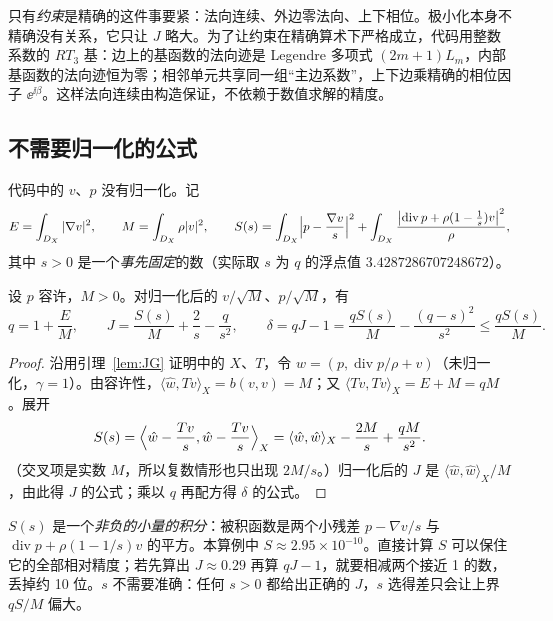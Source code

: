 \documentclass[11pt,a4paper,fontset=fandol]{ctexart}
\begin{document}
只有\emph{约束}是精确的这件事要紧：法向连续、外边零法向、上下相位。极小化本身不精确没有关系，它只让 $J$ 略大。为了让约束在精确算术下严格成立，代码用整数系数的 $RT_3$ 基：边上的基函数的法向迹是 Legendre 多项式 $(2m+1)L_m$，内部基函数的法向迹恒为零；相邻单元共享同一组“主边系数”，上下边乘精确的相位因子 $\ee^{\ii\beta}$。这样法向连续由构造保证，不依赖于数值求解的精度。

\subsection{不需要归一化的公式}

代码中的 $v$、$p$ 没有归一化。记
\begin{equation}
\label{eq:EMS}
E=\int_{D_X}|\nabla v|^2,\qquad M=\int_{D_X}\rho|v|^2,\qquad
S(s)=\int_{D_X}\Bigl|p-\frac{\nabla v}{s}\Bigr|^2+\int_{D_X}\frac{\bigl|\operatorname{div}p+\rho(1-\frac1s)v\bigr|^2}{\rho},
\end{equation}
其中 $s>0$ 是一个\emph{事先固定}的数（实际取 $s$ 为 $q$ 的浮点值 $3.4287286707248672$）。

\begin{lemma}[归一化与非负缺陷]
\label{lem:normalization}
设 $p$ 容许，$M>0$。对归一化后的 $v/\sqrt M$、$p/\sqrt M$，有
\begin{equation}
\label{eq:delta-S}
q=1+\frac EM,\qquad J=\frac{S(s)}M+\frac2s-\frac q{s^2},\qquad
\delta=qJ-1=\frac{qS(s)}M-\frac{(q-s)^2}{s^2}\le\frac{qS(s)}{M}.
\end{equation}
\end{lemma}

\begin{proof}
沿用引理~\ref{lem:JG} 证明中的 $X$、$T$，令 $\hat w=(p,\operatorname{div}p/\rho+v)$（未归一化，$\gamma=1$）。由容许性，$\langle\hat w,Tv\rangle_X=b(v,v)=M$；又 $\langle Tv,Tv\rangle_X=E+M=qM$。展开
\[
S(s)=\Bigl\langle\hat w-\frac{Tv}s,\hat w-\frac{Tv}s\Bigr\rangle_X=\langle\hat w,\hat w\rangle_X-\frac{2M}{s}+\frac{qM}{s^2} .
\]
（交叉项是实数 $M$，所以复数情形也只出现 $2M/s$。）归一化后的 $J$ 是 $\langle\hat w,\hat w\rangle_X/M$，由此得 $J$ 的公式；乘以 $q$ 再配方得 $\delta$ 的公式。
\end{proof}

\begin{keypoint}
$S(s)$ 是一个\emph{非负的小量的积分}：被积函数是两个小残差 $p-\nabla v/s$ 与 $\operatorname{div}p+\rho(1-1/s)v$ 的平方。本算例中 $S\approx2.95\times10^{-10}$。直接计算 $S$ 可以保住它的全部相对精度；若先算出 $J\approx0.29$ 再算 $qJ-1$，就要相减两个接近 1 的数，丢掉约 10 位。$s$ 不需要准确：任何 $s>0$ 都给出正确的 $J$，$s$ 选得差只会让上界 $qS/M$ 偏大。
\end{keypoint}
\end{document}
